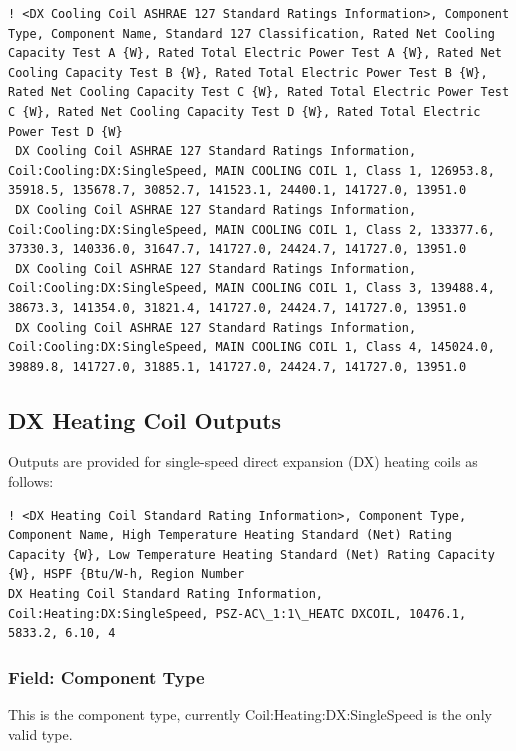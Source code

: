 \begin{lstlisting}
! <DX Cooling Coil ASHRAE 127 Standard Ratings Information>, Component Type, Component Name, Standard 127 Classification, Rated Net Cooling Capacity Test A {W}, Rated Total Electric Power Test A {W}, Rated Net Cooling Capacity Test B {W}, Rated Total Electric Power Test B {W}, Rated Net Cooling Capacity Test C {W}, Rated Total Electric Power Test C {W}, Rated Net Cooling Capacity Test D {W}, Rated Total Electric Power Test D {W}
 DX Cooling Coil ASHRAE 127 Standard Ratings Information, Coil:Cooling:DX:SingleSpeed, MAIN COOLING COIL 1, Class 1, 126953.8, 35918.5, 135678.7, 30852.7, 141523.1, 24400.1, 141727.0, 13951.0
 DX Cooling Coil ASHRAE 127 Standard Ratings Information, Coil:Cooling:DX:SingleSpeed, MAIN COOLING COIL 1, Class 2, 133377.6, 37330.3, 140336.0, 31647.7, 141727.0, 24424.7, 141727.0, 13951.0
 DX Cooling Coil ASHRAE 127 Standard Ratings Information, Coil:Cooling:DX:SingleSpeed, MAIN COOLING COIL 1, Class 3, 139488.4, 38673.3, 141354.0, 31821.4, 141727.0, 24424.7, 141727.0, 13951.0
 DX Cooling Coil ASHRAE 127 Standard Ratings Information, Coil:Cooling:DX:SingleSpeed, MAIN COOLING COIL 1, Class 4, 145024.0, 39889.8, 141727.0, 31885.1, 141727.0, 24424.7, 141727.0, 13951.0
\end{lstlisting}

\subsection{DX Heating Coil Outputs}\label{dx-heating-coil-outputs}

Outputs are provided for single-speed direct expansion (DX) heating coils as follows:

\begin{lstlisting}
! <DX Heating Coil Standard Rating Information>, Component Type, Component Name, High Temperature Heating Standard (Net) Rating Capacity {W}, Low Temperature Heating Standard (Net) Rating Capacity {W}, HSPF {Btu/W-h, Region Number
DX Heating Coil Standard Rating Information, Coil:Heating:DX:SingleSpeed, PSZ-AC\_1:1\_HEATC DXCOIL, 10476.1, 5833.2, 6.10, 4
\end{lstlisting}

\subsubsection{Field: Component Type}\label{field-component-type-5}

This is the component type, currently Coil:Heating:DX:SingleSpeed is the only valid type.

